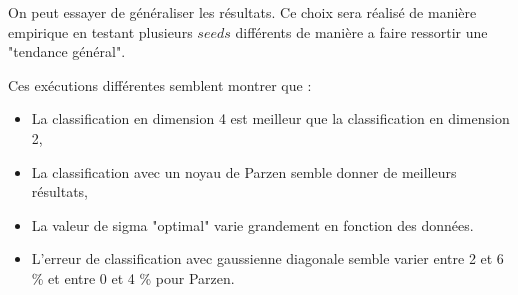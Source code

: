 \documentclass[a4paper,10pt]{article}
\begin{document}
On peut essayer de généraliser les résultats. Ce choix sera réalisé de manière empirique en testant plusieurs $seeds$ différents de manière a faire ressortir une "tendance général".

Ces exécutions différentes semblent montrer que :
\begin{itemize}
	\item La classification en dimension 4 est meilleur que la classification en dimension 2,
	\item La classification avec un noyau de Parzen semble donner de meilleurs résultats,
	\item La valeur de sigma "optimal" varie grandement en fonction des données.
	\item L'erreur de classification avec gaussienne diagonale semble varier entre 2 et 6 \% et entre 0 et 4 \% pour Parzen.
\end{itemize}
\end{document}
